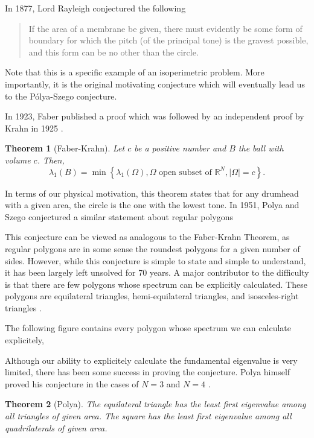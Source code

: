 \documentclass[12pt]{report}
\newtheorem{theorem}{Theorem}[section]
\numberwithin{definition}{section}
\begin{document}
In 1877, Lord Rayleigh conjectured the following \cite{rayleigh}

\begin{quote}
If the area of a membrane be given, there must evidently be some
form of boundary for which the pitch (of the principal tone) is the
gravest possible, and this form can be no other than the circle.
\end{quote}

Note that this is a specific example of an isoperimetric problem.
More importantly, it is the original motivating conjecture which will eventually lead us to the Pólya-Szego conjecture.

In 1923, Faber published a proof which was followed by an independent proof by Krahn in 1925 \cite{krahn}.
\begin{theorem}[Faber-Krahn]
 Let $c$ be a positive number and $B$ the ball with volume $c$. Then,
 \[
   \lambda_{1}(B) = \min \left\{ \lambda_{1}(\Omega), \Omega \text{ open subset of } \mathbb{R}^{N}, |\Omega| = c \right\} 
 .\] 
\end{theorem}
In terms of our physical motivation, this theorem states that for any drumhead with a given area, the circle is the one with the lowest tone.
In 1951, Polya and Szego conjectured a similar statement about regular polygons\cite{polya}

This conjecture can be viewed as analogous to the Faber-Krahn Theorem, as regular polygons are in some sense the roundest polygons for a given number of sides.
However, while this conjecture is simple to state and simple to understand, it has been largely left unsolved for 70 years.
A major contributor to the difficulty is that there are few polygons whose spectrum can be explicitly calculated.
These polygons are equilateral triangles, hemi-equilateral triangles, and isosceles-right triangles \cite{calculate}.

The following figure contains every polygon whose spectrum we can calculate explicitely, 


Although our ability to explicitely calculate the fundamental eigenvalue is very limited, there has been some success in proving the conjecture.
Polya himself proved his conjecture in the cases of $N = 3$ and $N = 4$ \cite{henrot}.

\begin{theorem}[Polya]
The equilateral triangle has the least first eigenvalue among all triangles of given area.
The square has the least first eigenvalue among all quadrilaterals of given area.
\end{theorem}
\end{document}
